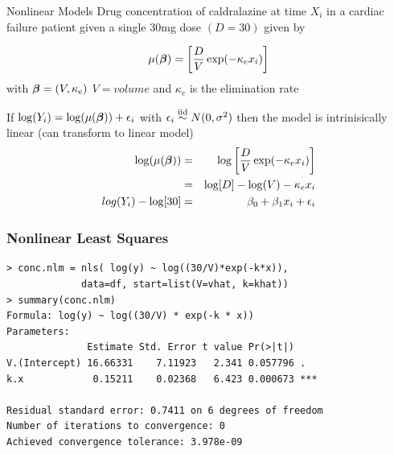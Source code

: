 \documentclass[handout]{beamer}
\begin{document}
\begin{frame}{Nonlinear Models}
Drug concentration of caldralazine  at time $X_i$ in a cardiac
failure patient given a single 30mg dose  $(D = 30)$ given by \pause

$$
\mu(\boldsymbol{\beta}) = \left[\frac{D}{V} \exp(-\kappa_e x_i) \right]
$$
with $\boldsymbol{\beta} = (V, \kappa_e)$  $V = volume$ and $\kappa_e$ is the
elimination rate \pause
  
If $\log(Y_i)  = \log(\mu(\boldsymbol{\beta})) + \epsilon_i$ with $\epsilon_i \mathrel{\mathop{\sim}\limits^{\rm iid}}
N(0, \sigma^2)$ then the model is intrinisically linear (can transform
to linear model)
\begin{eqnarray*}
\log(\mu(\boldsymbol{\beta})) & = & \log\left[\frac{D}{V} \exp(-\kappa_e x_i) \right]  \\
  & = & \log[D] - \log(V) -\kappa_e x_i \\
log(Y_i) - \log[30] & = &\beta_0 + \beta_1 x_i + \epsilon_i
\end{eqnarray*}
\pause

\end{frame}

\begin{frame}[fragile]\frametitle{Nonlinear Least Squares}
\begin{verbatim}
> conc.nlm = nls( log(y) ~ log((30/V)*exp(-k*x)), 
             data=df, start=list(V=vhat, k=khat))
> summary(conc.nlm)
Formula: log(y) ~ log((30/V) * exp(-k * x))
Parameters:
              Estimate Std. Error t value Pr(>|t|)    
V.(Intercept) 16.66331    7.11923   2.341 0.057796 .  
k.x            0.15211    0.02368   6.423 0.000673 ***

Residual standard error: 0.7411 on 6 degrees of freedom
Number of iterations to convergence: 0 
Achieved convergence tolerance: 3.978e-09
\end{verbatim}
\end{frame}
\end{document}
